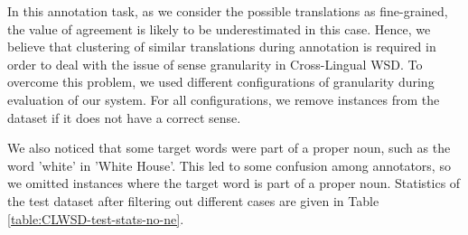 {%
In this annotation task, as we consider the possible translations as  fine-grained, the value of agreement is likely to be underestimated in this case. Hence, we believe that clustering of similar translations during annotation is required in order to deal with the issue of sense granularity in Cross-Lingual WSD. 
To overcome this problem, we used different configurations of granularity during evaluation of our system. 
For all configurations,
we remove instances from the dataset if it does not have a correct sense. 



We also noticed that some target words were part of a proper noun, such as the word 'white' in 'White House'. This led to some confusion among annotators, so we omitted instances where the target word is part of a proper noun. Statistics of the test dataset after filtering out different cases are given in Table \ref{table:CLWSD-test-stats-no-ne}.

}
